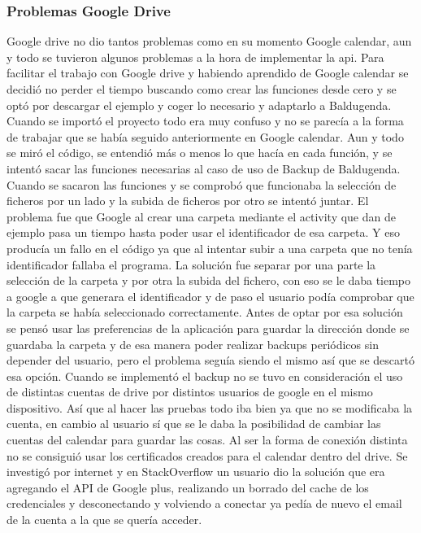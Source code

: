 \subsubsection{Problemas Google Drive}
\label{subsubsecc:Problemas Google Drive}

Google drive no dio tantos problemas como en su momento Google calendar, aun y todo se tuvieron algunos problemas a la hora de implementar la api.
Para facilitar el trabajo con Google drive y habiendo aprendido de Google calendar se decidió no perder el tiempo buscando como crear las funciones desde cero y se optó por descargar el ejemplo y coger lo necesario y adaptarlo a Baldugenda.
Cuando se importó el proyecto todo era muy confuso y no se parecía a la forma de trabajar que se había seguido anteriormente en Google calendar.
Aun y todo se miró el código, se entendió más o menos lo que hacía en cada función,  y se intentó sacar las funciones necesarias al caso de uso de Backup de Baldugenda.
Cuando se sacaron las funciones y se comprobó que funcionaba la selección de ficheros por un lado y la subida de ficheros por otro se intentó juntar.
El problema fue que Google al crear una carpeta mediante el activity que dan de ejemplo pasa un tiempo hasta poder usar el identificador de esa carpeta. Y eso producía un fallo en el código ya que al intentar subir a una carpeta que no tenía identificador fallaba el programa.
La solución fue separar por una parte la selección de la carpeta y por otra la subida del fichero, con eso se le daba tiempo a google a que generara el identificador y de paso el usuario podía comprobar que la carpeta se había seleccionado correctamente.
Antes de optar por esa solución se pensó usar las preferencias de la aplicación para guardar la dirección donde se guardaba la carpeta y de esa manera poder realizar backups periódicos sin depender del usuario, pero el problema seguía siendo el mismo así que se descartó esa opción.
Cuando se implementó el backup no se tuvo en consideración el uso de distintas cuentas de drive por distintos usuarios de google en el mismo dispositivo. Así que al hacer las pruebas todo iba bien ya que no se modificaba la cuenta, en cambio al usuario sí que se le daba la posibilidad de cambiar las cuentas del calendar para guardar las cosas. Al ser la forma de conexión distinta no se consiguió usar los certificados creados para el calendar dentro del drive.
Se investigó por internet y en StackOverflow un usuario dio la solución que era agregando el API de Google plus, realizando un borrado del cache de los credenciales y desconectando y volviendo a conectar ya pedía de nuevo el email de la cuenta a la que se quería acceder.


